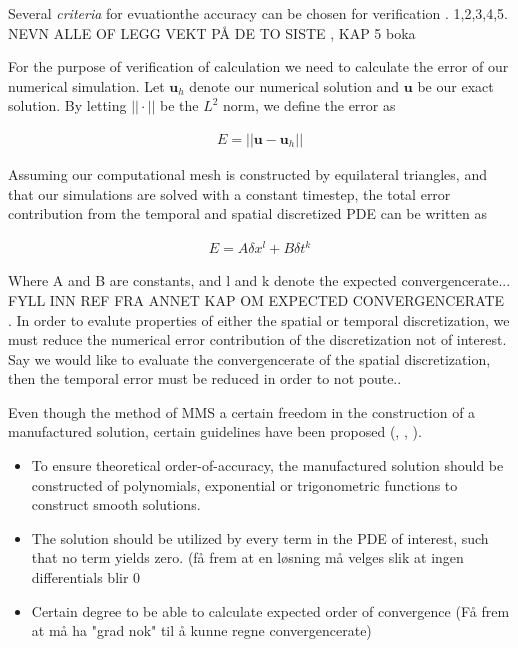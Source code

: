 Several \textit{criteria} for evuationthe accuracy can be chosen for verification \cite{Biggs}.
1,2,3,4,5. NEVN ALLE OF LEGG VEKT PÅ DE TO SISTE , KAP 5 boka

For the purpose of verification of calculation we need to calculate the error of our numerical simulation. Let $\mathbf{u}_h$ denote our numerical solution and $\mathbf{u}$ be our exact solution. By letting $|| \cdot || $ be the  $L^2$ norm, we define the error as

\begin{align*}
E = ||\mathbf{u} - \mathbf{u}_h  ||
\end{align*}

Assuming our computational mesh is constructed by equilateral triangles, and that our simulations are solved with a constant timestep, the total error contribution from the temporal and spatial 
discretized PDE can be written as

\begin{align*}
E = A \delta x^l + B \delta t^k
\end{align*}


Where A and B are constants, and l and k denote the expected convergencerate... FYLL INN REF FRA ANNET KAP OM EXPECTED CONVERGENCERATE \\. In order to evalute properties of either the spatial or temporal discretization, we must reduce the numerical error contribution of the discretization not of interest. Say we would like to evaluate the convergencerate of the spatial discretization, then the temporal error must be reduced in order to not poute.. 

Even though the method of MMS a certain freedom in the construction of a manufactured solution, certain guidelines have been proposed  (\cite{Steinberg1985}, \cite{Biggs}, \cite{Roache2002} ). 

\begin{itemize}
\item To ensure theoretical order-of-accuracy, the manufactured solution should be constructed of polynomials, exponential or trigonometric functions to construct smooth solutions.
\item The solution should be utilized by every term in the PDE of interest, such that no term yields zero.
(få frem at en løsning må velges slik at ingen differentials blir 0
\item Certain degree to be able to calculate expected order of convergence (Få frem at må ha "grad nok" til å kunne regne convergencerate) 
\end{itemize}

